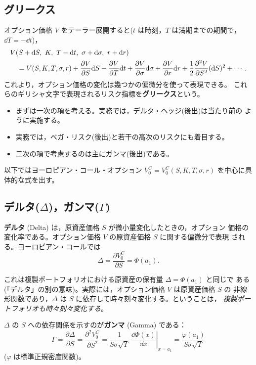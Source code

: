 \subsection{グリークス}

オプション価格 $V$ をテーラー展開すると($t$ は時刻，$T$ は満期までの期間で，
$\dd T = -\dd t$)，
\begin{align}
&V(S+\mathrm{d} S,\ K,\ T-\mathrm{d} t,\ \sigma+\mathrm{d}\sigma,\ r+\mathrm{d} r)\notag\\
&\quad = V(S,K,T,\sigma,r)
+ \frac{\partial V}{\partial S}\mathrm{d} S
- \frac{\partial V}{\partial T}\mathrm{d} t
+ \frac{\partial V}{\partial\sigma}\mathrm{d}\sigma
+ \frac{\partial V}{\partial r}\mathrm{d} r
+ \frac{1}{2}\frac{\partial^2V}{\partial S^2}(\mathrm{d} S)^2 + \cdots.
\end{align}
これより，オプション価格の変化は幾つかの偏微分を使って表現できる。
これらのギリシャ文字で表現されるリスク指標を\textbf{グリークス}という。
\begin{itemize}
\item まずは一次の項を考える。実務では，デルタ・ヘッジ(後出)は当たり前の
ように実施する。
\item 実務では，ベガ・リスク(後出)と若干の高次のリスクにも着目する。
\item 二次の項で考慮するのは主にガンマ(後出)である。
\end{itemize}
以下ではヨーロピアン・コール・オプション
$V_0^C = V_0^C(S,K,T,\sigma,r)$ を中心に具体的な式を出す。

\subsection{デルタ($\Delta$)，ガンマ($\Gamma$)}

\begin{definition}[デルタ]
\textbf{デルタ} (Delta) は，原資産価格 $S$ が微小量変化したときの，オプション
価格の変化率である。オプション価格 $V$ の原資産価格 $S$ に関する偏微分で表現
される。ヨーロピアン・コールでは
\begin{equation}
\Delta = \frac{\partial V_0^C}{\partial S} = \Phi(a_1).
\end{equation}
\end{definition}

これは複製ポートフォリオにおける原資産の保有量 $\Delta = \Phi(a_1)$ と同じで
ある(「デルタ」の別の意味)。実際には，オプション価格 $V$ は原資産価格 $S$ の
非線形関数であり，$\Delta$ は $S$ に依存して時々刻々変化する。ということは，
\emph{複製ポートフォリオも時々刻々変化する}。

\begin{definition}[ガンマ]
$\Delta$ の $S$ への依存関係を示すのが\textbf{ガンマ} (Gamma) である：
\begin{equation}
\Gamma = \frac{\partial\Delta}{\partial S}
= \frac{\partial^2 V_0^C}{\partial S^2}
= \frac{1}{S\sigma\sqrt{T}}\,
\left.\frac{\dd\Phi(x)}{\dd x}\right|_{x=a_1}
= \frac{\varphi(a_1)}{S\sigma\sqrt{T}}
\end{equation}
($\varphi$ は標準正規密度関数)。
\end{definition}

